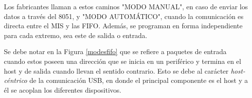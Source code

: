 	Los fabricantes llaman a estos caminos "MODO MANUAL", en caso de enviar los datos a través del 8051, y "MODO AUTOMÁTICO", cuando la comunicación es directa entre el MIS y las FIFO. Además, se programan en forma independiente para cada extremo, sea este de salida o entrada.%
	
	Se debe notar en la Figura \ref{modesfifo} que se refiere a paquetes de entrada cuando estos poseen una dirección que se inicia en un periférico y termina en el host y de salida cuando llevan el sentido contrario. Esto se debe al carácter {\it host-céntrico} de la comunicación USB, en donde el principal componente es el host y a él se acoplan los diferentes dispositivos.